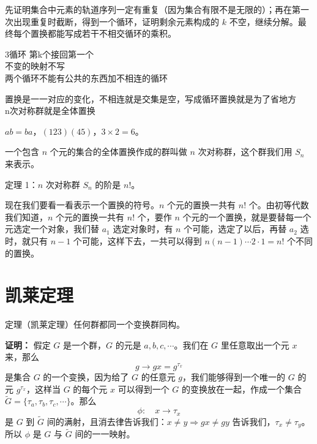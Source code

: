 \begin{note}[证明置换可以写成不相交循环之积]
先证明集合中元素的轨道序列一定有重复（因为集合有限不是无限的）；再在第一次出现重复时截断，得到一个循环，证明剩余元素构成的 $k$ 不空，继续分解。最终每个置换都能写成若干不相交循环的乘积。
\end{note}

\begin{note}[循环置换]
3循环 第k个接回第一个 \\
不变的映射不写 \\
两个循环不能有公共的东西加不相连的循环
\end{note}

\begin{note}[置换群]
置换是一一对应的变化，不相连就是交集是空，写成循环置换就是为了省地方 \\
n次对称群就是全体置换
\end{note}

\begin{note}[只要不相连就可以快速求阶数而且有交换律]
$ab=ba$，$(123)(45)$，$3\times2=6$。
\end{note}

\begin{definition}[对称群]
一个包含 $n$ 个元的集合的全体置换作成的群叫做 $n$ 次对称群，这个群我们用 $S_n$ 来表示。
\end{definition}

\begin{theorem}
定理 1：$n$ 次对称群 $S_n$ 的阶是 $n!$。

现在我们要看一看表示一个置换的符号。$n$ 个元的置换一共有 $n!$ 个。由初等代数我们知道，$n$ 个元的置换一共有 $n!$ 个，要作 $n$ 个元的一个置换，就是要替每一个元选定一个对象，我们替 $a_1$ 选定对象时，有 $n$ 个可能，选定了以后，再替 $a_2$ 选时，就只有 $n-1$ 个可能，这样下去，一共可以得到 $n(n-1)\cdots2\cdot1=n!$ 个不同的置换。
\end{theorem}

\section{凯莱定理}

\begin{theorem}
定理（凯莱定理）任何群都同一个变换群同构。

\textbf{证明：} 假定 $G$ 是一个群，$G$ 的元是 $a,b,c,\cdots$。我们在 $G$ 里任意取出一个元 $x$ 来，那么
\[
g\longrightarrow gx=g^{\tau_x}
\]
是集合 $G$ 的一个变换，因为给了 $G$ 的任意元 $g$，我们能够得到一个唯一的 $G$ 的元 $g^{\tau_x}$，这样当 $G$ 的每个元 $x$ 可以得到一个 $G$ 的变换放在一起，作成一个集合 $\tilde{G}=\{\tau_a,\tau_b,\tau_c,\cdots\}$。那么
\[
\phi:\quad x\longrightarrow\tau_x
\]
是 $G$ 到 $\tilde{G}$ 间的满射，且消去律告诉我们：$x\ne y\Rightarrow gx\ne gy$ 告诉我们，$\tau_x\ne\tau_y$。所以 $\phi$ 是 $G$ 与 $\tilde{G}$ 间的一一映射。
\end{theorem}

